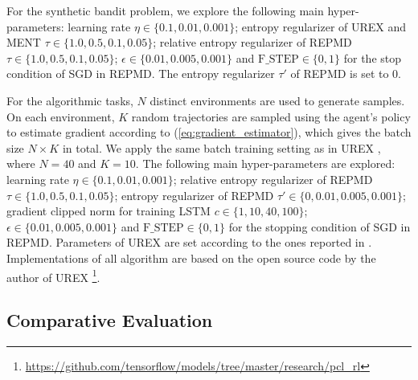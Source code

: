 \documentclass{article}
\begin{document}
For the synthetic bandit problem, we explore the following main hyper-parameters: learning rate $\eta \in \{0.1, 0.01, 0.001\}$; entropy regularizer of UREX and MENT $\tau\in \{1.0, 0.5, 0.1, 0.05\}$; relative entropy regularizer of REPMD $\tau\in \{1.0, 0.5, 0.1, 0.05\}$; $\epsilon\in \{0.01, 0.005, 0.001\}$ and $\text{F\_STEP}\in \{0,1\}$ for the stop condition of SGD in REPMD. The entropy regularizer $\tau'$ of REPMD is set to 0.  

For the algorithmic tasks, $N$ distinct environments are used to generate samples. On each environment, $K$ random trajectories are sampled using the agent's policy to estimate gradient according to (\ref{eq:gradient_estimator}), which gives the batch size $N\times K$ in total. We apply the same batch training setting as in UREX \cite{nachum2017improving}, where $N=40$ and $K=10$. The following main hyper-parameters are explored: learning rate $\eta \in \{0.1, 0.01, 0.001\}$; relative entropy regularizer of REPMD $\tau\in \{1.0, 0.5, 0.1, 0.05\}$; entropy regularizer of REPMD $\tau'\in \{0, 0.01, 0.005, 0.001\}$; gradient clipped norm for training LSTM $c\in \{1, 10, 40, 100\}$; $\epsilon\in \{0.01, 0.005, 0.001\}$ and $\text{F\_STEP}\in \{0,1\}$ for the stopping condition of SGD in REPMD. Parameters of UREX are set according to the ones reported in \cite{nachum2017improving}. Implementations of all algorithm are based on the open source code by the author of UREX \footnote{\url{https://github.com/tensorflow/models/tree/master/research/pcl_rl}}.

\subsection{Comparative Evaluation}
\end{document}
